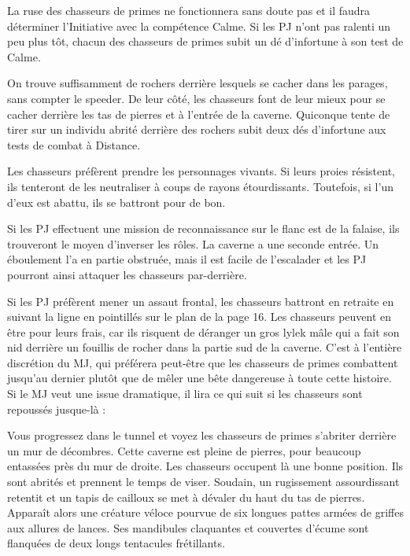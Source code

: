 \documentclass[a4paper,10pt,twoside,twocolumn,openany]{book}
\begin{document}
La ruse des chasseurs de primes ne fonctionnera sans
doute pas et il faudra déterminer l’Initiative avec la compétence Calme. Si les PJ n’ont pas ralenti un peu plus
tôt, chacun des chasseurs de primes subit un dé d’infortune \boost à son test de Calme.

On trouve suffisamment de rochers derrière lesquels
se cacher dans les parages, sans compter le speeder. De
leur côté, les chasseurs font de leur mieux pour se cacher
derrière les tas de pierres et à l’entrée de la caverne.
Quiconque tente de tirer sur un individu abrité derrière
des rochers subit deux dés d’infortune \boost \boost aux tests de
combat à Distance.

Les chasseurs préfèrent prendre les personnages vivants. Si leurs proies résistent, ils tenteront de les neutraliser à coups de rayons étourdissants. Toutefois, si l’un
d’eux est abattu, ils se battront pour de bon.

Si les PJ effectuent une mission de reconnaissance
sur le flanc est de la falaise, ils trouveront le moyen d’inverser les rôles. La caverne a une seconde entrée. Un
éboulement l’a en partie obstruée, mais il est facile de
l’escalader et les PJ pourront ainsi attaquer les chasseurs
par-derrière.

Si les PJ préfèrent mener un assaut frontal, les chasseurs battront en retraite en suivant la ligne en pointillés
sur le plan de la page 16. Les chasseurs peuvent en être
pour leurs frais, car ils risquent de déranger un gros lylek
mâle qui a fait son nid derrière un fouillis de rocher dans
la partie sud de la caverne. C’est à l’entière discrétion du
MJ, qui préférera peut-être que les chasseurs de primes
combattent jusqu’au dernier plutôt que de mêler une
bête dangereuse à toute cette histoire. Si le MJ veut une
issue dramatique, il lira ce qui suit si les chasseurs sont
repoussés jusque-là :
\begin{quotebox}
Vous progressez dans le tunnel et voyez les chasseurs de primes s’abriter derrière un mur de décombres. Cette caverne est pleine de pierres, pour
beaucoup entassées près du mur de droite. Les
chasseurs occupent là une bonne position. Ils sont
abrités et prennent le temps de viser.
Soudain, un rugissement assourdissant retentit et
un tapis de cailloux se met à dévaler du haut du
tas de pierres. Apparaît alors une créature véloce
pourvue de six longues pattes armées de griffes
aux allures de lances. Ses mandibules claquantes
et couvertes d’écume sont flanquées de deux
longs tentacules frétillants.
\end{quotebox}
\end{document}
